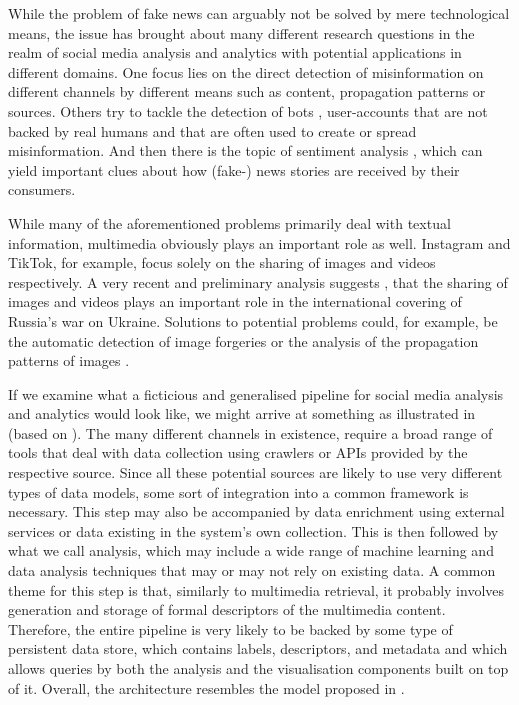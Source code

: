 While the problem of fake news can arguably not be solved by mere technological means, the issue has brought about many different research questions in the realm of social media analysis and analytics with potential applications in different domains. One focus lies on the direct detection of misinformation on different channels by different means such as content, propagation patterns \cite{Zhou:2020Survey} or sources. Others try to tackle the detection of bots \cite{Davis:2016BotOrNot,Cresci:2020Decade}, user-accounts that are not backed by real humans and that are often used to create or spread misinformation. And then there is the topic of sentiment analysis \cite{Yue:2019Survey}, which can yield important clues about how (fake-) news stories are received by their consumers.

While many of the aforementioned problems primarily deal with textual information, multimedia obviously plays an important role as well. Instagram and TikTok, for example, focus solely on the sharing of images and videos respectively. A very recent and preliminary analysis suggests \cite{Ciuriak:2022Role}, that the sharing of images and videos plays an important role in the international covering of Russia's war on Ukraine. Solutions to potential problems could, for example, be the automatic detection of image forgeries \cite{Farid:2009Image} or the analysis of the propagation patterns of images \cite{Zannettou:2018Origins}.

If we examine what a ficticious and generalised pipeline for social media analysis and analytics would look like, we might arrive at something as illustrated in  (based on \cite{Zhu2015:Multimedia,Cui:2019Defend,Yang:2019XFake,Bagade:2020Kauwa}). The many different channels in existence, require a broad range of tools that deal with data collection using crawlers or APIs provided by the respective source. Since all these potential sources are likely to use very different types of data models, some sort of integration into a common framework is necessary. This step may also be accompanied by data enrichment using external services or data existing in the system's own collection. This is then followed by what we call analysis, which may include a wide range of machine learning and data analysis techniques that may or may not rely on existing data. A common theme for this step is that, similarly to multimedia retrieval, it probably involves generation and storage of formal descriptors of the multimedia content. Therefore, the entire pipeline is very likely to be backed by some type of persistent data store, which contains labels, descriptors, and metadata and which allows queries by both the analysis and the visualisation components built on top of it. Overall, the architecture resembles the model proposed in \cite{Zahalka:2014Towards}. 

